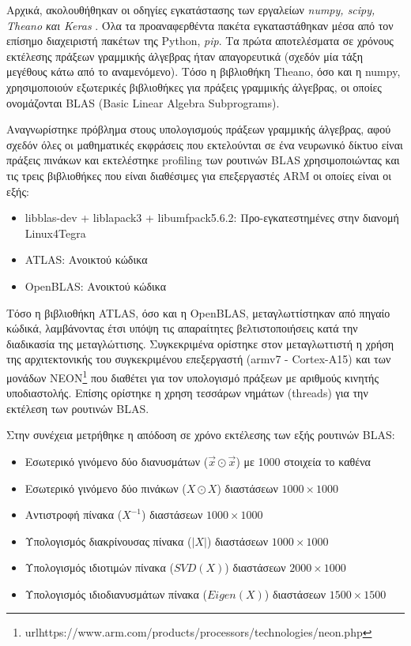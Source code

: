 Αρχικά, ακολουθήθηκαν οι οδηγίες εγκατάστασης των εργαλείων \emph{numpy, scipy, Theano και Keras}
. Όλα τα προαναφερθέντα πακέτα εγκαταστάθηκαν μέσα από τον επίσημο διαχειριστή πακέτων της Python, \emph{pip}.
Τα πρώτα αποτελέσματα σε χρόνους εκτέλεσης πράξεων γραμμικής άλγεβρας ήταν
απαγορευτικά (σχεδόν μία τάξη μεγέθους κάτω από το αναμενόμενο).
Τόσο η βιβλιοθήκη Theano, όσο και η numpy, χρησιμοποιούν εξωτερικές βιβλιοθήκες
για πράξεις γραμμικής άλγεβρας, οι οποίες ονομάζονται BLAS (Basic Linear Algebra Subprograms).

Αναγνωρίστηκε πρόβλημα στους υπολογισμούς πράξεων γραμμικής άλγεβρας,
αφού σχεδόν όλες οι μαθηματικές εκφράσεις που εκτελούνται σε ένα
νευρωνικό δίκτυο είναι πράξεις πινάκων και εκτελέστηκε profiling των
ρουτινών BLAS χρησιμοποιώντας και τις τρεις βιβλιοθήκες που είναι διαθέσιμες για
επεξεργαστές ARM οι οποίες είναι οι εξής:
\begin{itemize}
  \item{libblas-dev + liblapack3 + libumfpack5.6.2: Προ-εγκατεστημένες στην διανομή Linux4Tegra}
  \item{ATLAS: Ανοικτού κώδικα}
  \item{OpenBLAS: Ανοικτού κώδικα}
\end{itemize}

Τόσο η βιβλιοθήκη ATLAS, όσο και η OpenBLAS, μεταγλωττίστηκαν από πηγαίο κώδικά,
λαμβάνοντας έτσι υπόψη τις απαραίτητες βελτιστοποιήσεις κατά την διαδικασία
της μεταγλώττισης.
Συγκεκριμένα ορίστηκε στον μεταγλωττιστή η χρήση της αρχιτεκτονικής του
συγκεκριμένου επεξεργαστή (armv7 - Cortex-A15) και των μονάδων
NEON\footnote{url{https://www.arm.com/products/processors/technologies/neon.php}}
που διαθέτει για τον υπολογισμό πράξεων με αριθμούς κινητής %
υποδιαστολής. Επίσης ορίστηκε η χρηση τεσσάρων νημάτων (threads)
για την εκτέλεση των ρουτινών BLAS.

Στην συνέχεια μετρήθηκε η απόδοση σε χρόνο εκτέλεσης των εξής ρουτινών BLAS:
\begin{itemize}
  \item{Εσωτερικό γινόμενο δύο διανυσμάτων ($\vec{x} \odot \vec{x}$) με 1000 στοιχεία το καθένα}
  \item{Εσωτερικό γινόμενο δύο πινάκων ($X \odot X$) διαστάσεων $1000 \times 1000$}
  \item{Αντιστροφή πίνακα ($X^{-1}$) διαστάσεων $1000 \times 1000$}
  \item{Υπολογισμός διακρίνουσας πίνακα ($|X|$) διαστάσεων $1000 \times 1000$}
  \item{Υπολογισμός ιδιοτιμών πίνακα ($SVD(X)$) διαστάσεων $2000 \times 1000$}
  \item{Υπολογισμός ιδιοδιανυσμάτων πίνακα ($Eigen(X)$) διαστάσεων $1500 \times 1500$}
\end{itemize}

